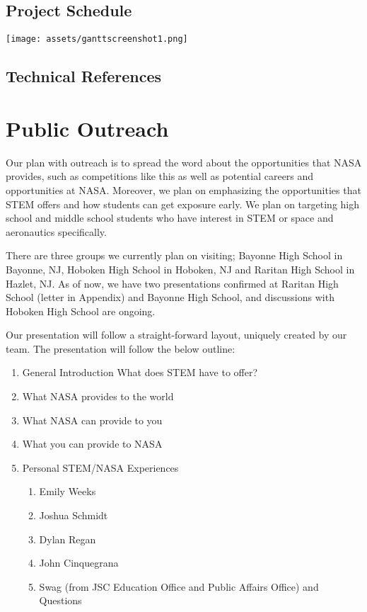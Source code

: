 \documentclass{article}
\let\Oldsection\section
\renewcommand{\section}{\FloatBarrier\Oldsection}
\let\Oldsubsection\subsection
\renewcommand{\subsection}{\FloatBarrier\Oldsubsection}
\begin{document}
\newpage

\subsection{Project Schedule}

\texttt{[image: assets/ganttscreenshot1.png]}

\newpage

\subsection{Technical References}

\printbibliography

\newpage

\section{Public Outreach}

Our plan with outreach is to spread the word about the opportunities that NASA provides, such as competitions like this as well as potential careers and opportunities at NASA. Moreover, we plan on emphasizing the opportunities that STEM offers and how students can get exposure early. We plan on targeting high school and middle school students who have interest in STEM or space and aeronautics specifically.

There are three groups we currently plan on visiting; Bayonne High School in Bayonne, NJ, Hoboken High School in Hoboken, NJ and Raritan High School in Hazlet, NJ. As of now, we have two presentations confirmed at Raritan High School (letter in Appendix) and Bayonne High School, and discussions with Hoboken High School are ongoing.

Our presentation will follow a straight-forward layout, uniquely created by our team. The presentation will follow the below outline:

\begin{enumerate}
\item General Introduction What does STEM have to offer?
\item What NASA provides to the world
\item What NASA can provide to you
\item What you can provide to NASA
\item Personal STEM/NASA Experiences
\begin{enumerate}
\item Emily Weeks
\item Joshua Schmidt
\item Dylan Regan
\item John Cinquegrana
\item Swag (from JSC Education Office and Public Affairs Office) and Questions
\end{enumerate}
\end{enumerate}
\end{document}
